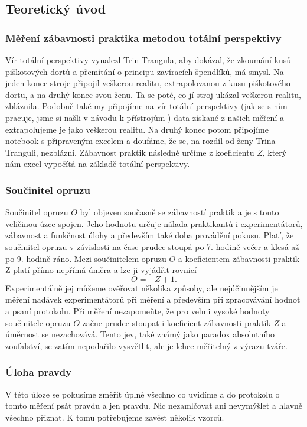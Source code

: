\documentclass[english]{article}
\begin{document}
\subsection{Teoretický úvod}
\subsubsection{Měření zábavnosti praktika metodou totální perspektivy}
Vír totální perspektivy vynalezl Trin Trangula, aby dokázal, že zkoumání kusů piškotových dortů a přemítání o principu zavíracích špendlíků, má smysl. Na jeden konec stroje připojil veškerou realitu, extrapolovanou z kusu piškotového dortu, a na druhý konec svou ženu. Ta se poté, co jí stroj ukázal veškerou realitu, zbláznila. Podobně také my připojíme na vír totální perspektivy (jak se s ním pracuje, jsme si našli v návodu k přístrojům \cite{bib:pristroje}) data získané z našich měření a extrapolujeme je jako veškerou realitu. Na druhý konec potom připojíme notebook s připraveným excelem a doufáme, že se, na rozdíl od ženy Trina Tranguli, nezblázní. Zábavnost praktik následně určíme z koeficientu $Z$, který nám excel vypočítá na základě totální perspektivy.  
\subsubsection{Součinitel opruzu}
Součinitel opruzu $O$ byl objeven současně se zábavností praktik a je s touto veličinou úzce spojen. Jeho hodnotu určuje nálada praktikantů i experimentátorů, zábavnost a funkčnost úlohy a především také doba provádění pokusu. Platí, že součinitel opruzu v závislosti na čase prudce stoupá po 7. hodině večer a klesá až po 9. hodině ráno. Mezi součinitelem opruzu $O$ a koeficientem zábavnosti praktik Z platí přímo nepřímá úměra a lze ji vyjádřit rovnicí
\begin{equation}\label{eq:oz1}
	O = -Z + 1.
\end{equation}	
Experimentálně jej můžeme ověřovat několika způsoby, ale nejúčinnějším je měření nadávek experimentátorů při měření a především při zpracovávání hodnot a psaní protokolu. Při měření nezapomeňte, že pro velmi vysoké hodnoty součinitele opruzu $O$ začne prudce stoupat i koeficient zábavnosti praktik $Z$ a úměrnost se nezachovává. Tento jev, také známý jako paradox absolutního zoufalství, se zatím nepodařilo vysvětlit, ale je lehce měřitelný z výrazu tváře.
\subsubsection{Úloha pravdy}
V této úloze se pokusíme změřit úplně všechno co uvidíme a do protokolu o tomto měření psát pravdu a jen pravdu. Nic nezamlčovat ani nevymýšlet a hlavně všechno přiznat. K tomu potřebujeme zavést několik vzorců. 
\end{document}
